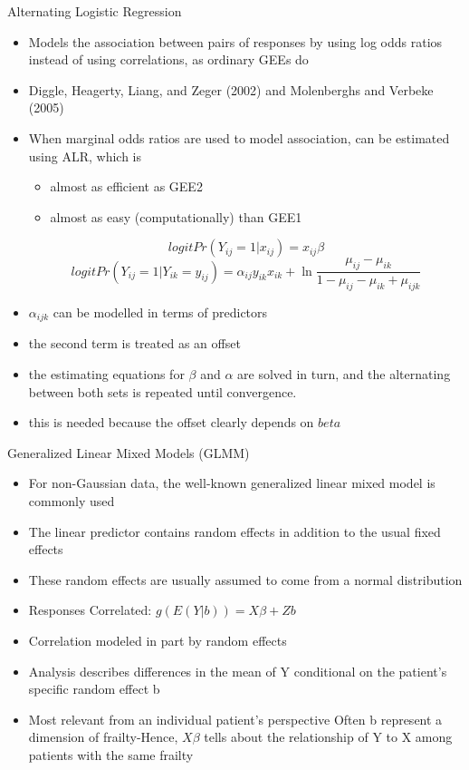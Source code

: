 \documentclass{beamer}
\begin{document}
\begin{frame}{Alternating Logistic Regression}
\begin{itemize}
	\item Models the association between pairs of responses by using log odds ratios instead of using correlations, as ordinary GEEs do
	\item Diggle, Heagerty, Liang, and Zeger (2002) and Molenberghs and Verbeke (2005)
	\item When marginal odds ratios are used to model association, can be estimated using ALR, which is
	\begin{itemize}
		\item almost as efficient as GEE2
		\item almost as easy (computationally) than GEE1
	\end{itemize}
\[logitPr(Y_{ij}=1|x_{ij})=x_{ij}\beta \]
\[logitPr(Y_{ij}=1|Y_{ik}=y_{ij})=\alpha_{ij}y_{ik}x_{ik}+\ln\frac{\mu_{ij}-\mu_{ik}}{1-\mu_{ij}-\mu_{ik}+\mu_{ijk}} \]

\end{itemize}
\end{frame}


\begin{frame}{}
\begin{itemize}
	\item $\alpha_{ijk}$ can be modelled in terms of predictors
	\item the second term is treated as an offset
	\item the estimating equations for $\beta$ and $\alpha$  are solved in turn, and the alternating between both sets is repeated until convergence.
	\item this is needed because the offset clearly depends on $beta$
\end{itemize}
\end{frame}

\begin{frame}{Generalized Linear Mixed Models (GLMM)}
\begin{itemize}
	\item For non-Gaussian data, the well-known generalized linear mixed model is commonly used \vspace{0.25cm}
	\item The linear predictor contains random effects in addition to the usual fixed effects \vspace{0.25cm}
	\item These random effects are usually assumed to come from a normal distribution
	\item Responses Correlated: $g(E(Y|b))=X\beta + Zb$
	\item Correlation modeled in part by random effects
	\item Analysis describes differences in the mean of Y conditional on the patient’s specific random effect b
	\item Most relevant from an individual patient’s perspective Often b represent a dimension of frailty-Hence, $X\beta$ tells about the relationship of Y  to X among patients with the same frailty
\end{itemize}
\end{frame}
\end{document}
